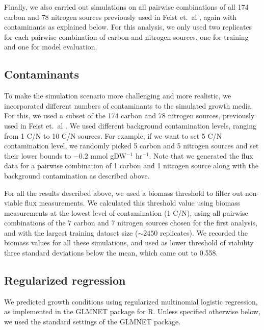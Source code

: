 \documentclass[12pt]{article}
\begin{document}
Finally, we also carried out simulations on all pairwise combinations of all 174 carbon and 78 nitrogen sources previously used in Feist et.\ al \cite{Feistetal2007}, again with contaminants as explained below. For this analysis, we only used two replicates for each pairwise combination of carbon and nitrogen sources, one for training and one for model evaluation.

\subsection*{Contaminants}
To make the simulation scenario more challenging and more realistic, we incorporated different numbers of contaminants to the simulated growth media. For this, we used a subset of the 174 carbon and 78 nitrogen sources, previously used in Feist et.\ al \cite{Feistetal2007}.  We used different background contamination levels, ranging from 1 C/N to 10 C/N sources. For example, if we want to set 5 C/N contamination level, we randomly picked 5 carbon and 5 nitrogen sources and set their lower bounds to $-0.2$ mmol gDW$^{-1}$ hr$^{-1}$. Note that we generated the flux data for a pairwise combination of 1 carbon and 1 nitrogen source along with the background contamination as described above. 

For all the results described above, we used a biomass threshold to filter out non-viable flux measurements. We calculated this threshold value using biomass measurements at the lowest level of contamination (1 C/N), using all pairwise combinations of the 7 carbon and 7 nitrogen sources chosen for the first analysis, and with the largest training dataset size ($\sim2450$ replicates). We recorded the biomass values for all these simulations, and used as lower threshold of viability three standard deviations below the mean, which came out to 0.558.

\subsection*{Regularized regression}

We predicted growth conditions using regularized multinomial logistic regression, as implemented in the GLMNET package \cite{Friedmanetal2010} for R. Unless specified otherwise below, we used the standard settings of the GLMNET package.
\end{document}
